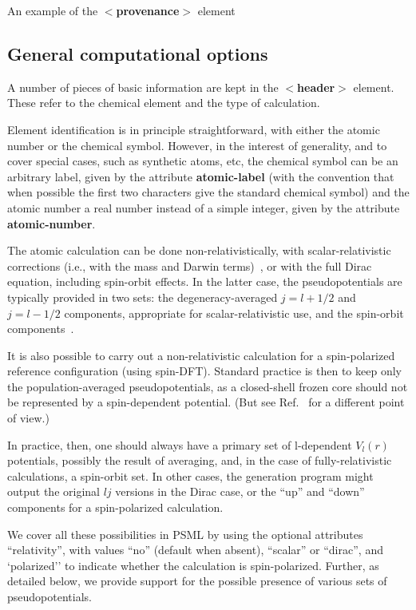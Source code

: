 \documentclass[prb,showpacs,superscriptaddress]{revtex4-1}
\def\tag#1{\textbf{$<$#1$>$}}
\def\att#1{\textbf{#1}}
\begin{document}
%
 \begin{table}[h]
    \caption[ ]{ An example of the \tag{provenance} element }
    
    \label{table:provenance}
 \end{table}
%

\subsection{General computational options}

A number of pieces of basic information are kept in the \tag{header}
element. These refer to the chemical element and the type of
calculation.

Element identification is in principle straightforward, with either
the atomic number or the chemical symbol. However, in the interest of
generality, and to cover special cases, such as synthetic atoms, etc, the
chemical symbol can be an arbitrary label, given by the attribute
\att{atomic-label} (with the convention that when possible the first
two characters give the standard chemical symbol) and the atomic
number a real number instead of a simple integer, given by the
attribute \att{atomic-number}.
 
 The atomic calculation can be done non-relativistically, with
 scalar-relativistic corrections (i.e., with the mass and Darwin
 terms)~\cite{Koelling,Takeda}, or with the full Dirac equation,
 including spin-orbit effects. In the latter case, the
 pseudopotentials are typically provided in two sets: the
 degeneracy-averaged $j=l+1/2$ and $j=l-1/2$ components, appropriate
 for scalar-relativistic use, and the spin-orbit
 components~\cite{Bachelet-82}.

 It is also possible to carry out a non-relativistic calculation for a
 spin-polarized reference configuration (using spin-DFT). Standard
 practice is then to keep only the population-averaged
 pseudopotentials, as a closed-shell frozen core should not be
 represented by a spin-dependent potential. (But see
 Ref.~ for a different point of view.)

 In practice, then, one should always have a primary set of
 l-dependent $V_l(r)$ potentials, possibly the result of averaging,
 and, in the case of fully-relativistic calculations, a spin-orbit
 set. In other cases, the generation program might output the original
 $lj$ versions in the Dirac case, or the ``up'' and ``down''
 components for a spin-polarized calculation.

 We cover all these possibilities in PSML by using the optional
 attributes ``relativity'', with values ``no'' (default when absent),
 ``scalar'' or ``dirac'', and `polarized'' to indicate whether the
 calculation is spin-polarized. Further, as
 detailed below, we provide support for the possible presence of various
 sets of pseudopotentials.
\end{document}
